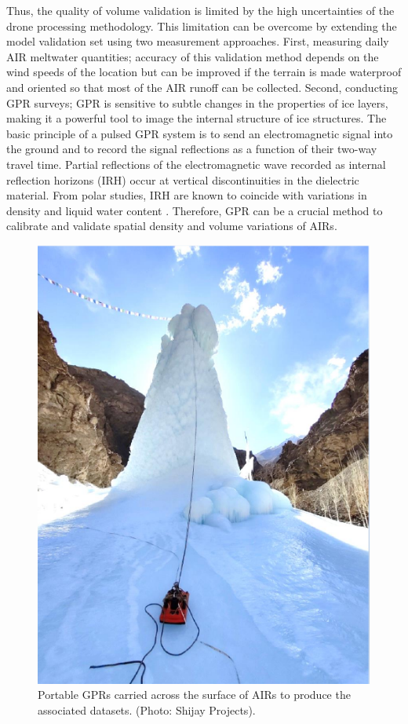 Thus, the quality of volume validation is limited by the high uncertainties of the drone processing
methodology. This limitation can be overcome by extending the model validation set using two measurement
approaches. First, measuring daily \ac{AIR} meltwater quantities; accuracy of this validation method
depends on the wind speeds of the location but can be improved if the terrain is made waterproof and oriented so
that most of the \ac{AIR} runoff can be collected. Second, conducting \ac{GPR} surveys; \ac{GPR} is
sensitive to subtle changes in the properties of ice layers, making it a powerful tool to image the internal
structure of ice structures. The basic principle of a pulsed \ac{GPR} system is to send an electromagnetic
signal into the ground and to record the signal reflections as a function of their two-way travel time. Partial
reflections of the electromagnetic wave recorded as internal reflection horizons (IRH) occur at vertical
discontinuities in the dielectric material. From polar studies, IRH are known to coincide with variations in
density and liquid water content \citep{forster2014extensive}. Therefore, \ac{GPR} can be a crucial method to
calibrate and validate spatial density and volume variations of \ac{AIRs}.


\begin{figure}[htb]
  \centering
	\includegraphics[width=8 cm]{figs/gpr_survey}
  \caption{Portable \ac{GPR}s carried across the surface of \ac{AIRs} to produce the associated datasets.
    (Photo: Shijay Projects).}
	\label{fig:gpr_survey}
\end{figure}

